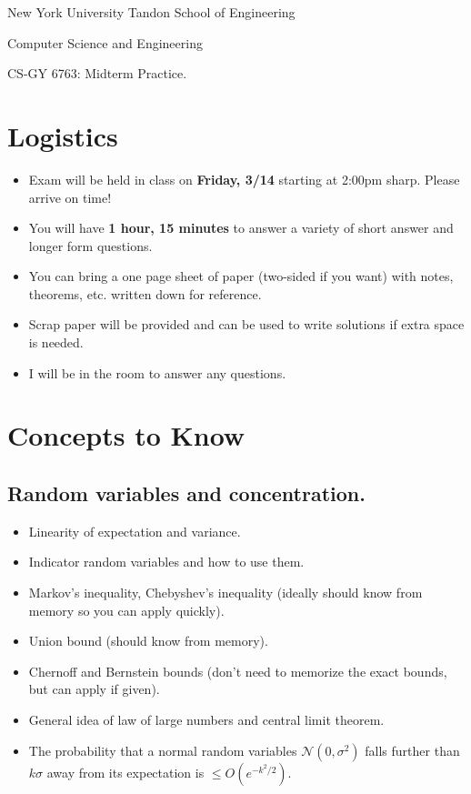 \documentclass[10pt]{article}
\begin{document}
	
\begin{center}
	\normalsize
	New York University Tandon School of Engineering
	
	Computer Science and Engineering
	\medskip
	
	\large
	CS-GY 6763: Midterm Practice. 
	\medskip
\end{center} 

\section{Logistics}
\begin{itemize}
	\item Exam will be held in class on \textbf{Friday, 3/14} starting at 2:00pm sharp. Please arrive on time!
	\item You will have \textbf{1 hour, 15 minutes} to answer a variety of short answer and longer form questions.
	\item You can bring a one page sheet of paper (two-sided if you want) with notes, theorems, etc. written down for reference. 
	\item Scrap paper will be provided and can be used to write solutions if extra space is needed. 
	\item I will be in the room to answer any questions.
\end{itemize}

\section{Concepts to Know}

\subsection{Random variables and concentration.}
\begin{itemize}
	\item Linearity of expectation and variance.
	\item Indicator random variables and how to use them.
	\item Markov's inequality, Chebyshev's inequality (ideally should know from memory so you can apply quickly).
	\item Union bound  (should know from memory).
	\item Chernoff and Bernstein bounds (don't need to memorize the exact bounds, but can apply if given).
	\item General idea of law of large numbers and central limit theorem. 
	\item The probability that a normal random variables $\mathcal{N}(0,\sigma^2)$ falls further than $k\sigma$ away from its expectation is $\leq O(e^{-k^2/2})$. 
\end{itemize}
\end{document}
